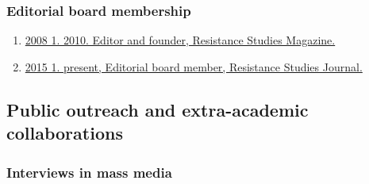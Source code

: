 \documentclass[
]{article}
\providecommand{\tightlist}{%
  \setlength{\itemsep}{0pt}\setlength{\parskip}{0pt}}
\begin{document}
\hypertarget{editorial-board-membership}{%
\subsubsection{Editorial board
membership}\label{editorial-board-membership}}

\begin{enumerate}
\def\labelenumi{\arabic{enumi}.}
\tightlist
\item
  \href{http://resistance-journal.org/the-old-rs-mag/}{2008 1. 2010.
  Editor and founder, Resistance Studies Magazine.}
\item
  \href{http://resistance-journal.org/editorialboard/}{2015 1. present,
  Editorial board member, Resistance Studies Journal.}
\end{enumerate}

\hypertarget{public-outreach-and-extra-academic-collaborations}{%
\subsection{Public outreach and extra-academic
collaborations}\label{public-outreach-and-extra-academic-collaborations}}

\hypertarget{interviews-in-mass-media}{%
\subsubsection{Interviews in mass
media}\label{interviews-in-mass-media}}
\end{document}

